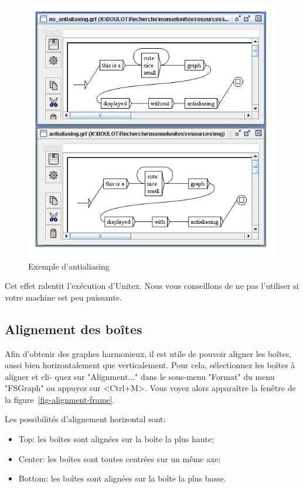 \bigskip
\begin{figure}[!ht]
\begin{center}
\includegraphics[width=13.5cm]{resources/img/fig5-22.png}
\caption{Exemple d'antialiasing\label{fig-antialiasing}}
\end{center}
\end{figure}

\noindent Cet effet ralentit l’exécution d’Unitex. Nous vous conseillons de ne pas l’utiliser
si votre machine est peu puissante.



\subsection{Alignement des boîtes}
Afin d’obtenir des graphes harmonieux, il est utile de pouvoir aligner les boîtes, aussi
bien horizontalement que verticalement. Pour cela, sélectionnez les boîtes à aligner et cli-
quez sur "Alignment..." dans le sous-menu "Format" du menu "FSGraph" ou appuyez sur
<Ctrl+M>. Vous voyez alors apparaître la fenêtre de la figure~\ref{fig-alignment-frame}.

\bigskip
\noindent Les possibilités d’alignement horizontal sont:
\begin{itemize}
  \item Top: les boîtes sont alignées sur la boîte la plus haute;
  \item Center: les boîtes sont toutes centrées sur un même axe;
  \item Bottom: les boîtes sont alignées sur la boîte la plus basse.
\end{itemize}

